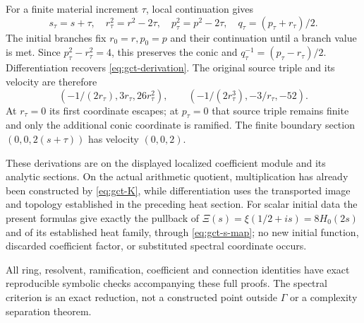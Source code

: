 For a finite material increment $\tau$, local continuation gives
\[
 s_\tau=s+\tau,\quad r_\tau^2=r^2-2\tau,\quad
 p_\tau^2=p^2-2\tau,\quad q_\tau=(p_\tau+r_\tau)/2.
\]
The initial branches fix $r_0=r,p_0=p$ and their continuation until a
branch value is met. Since $p_\tau^2-r_\tau^2=4$, this preserves the
conic and $q_\tau^{-1}=(p_\tau-r_\tau)/2$.
Differentiation recovers \eqref{eq:gct-derivation}. The original source
triple and its velocity are therefore
\[
 (-1/(2r_\tau),3r_\tau,26r_\tau^2),\qquad
 (-1/(2r_\tau^3),-3/r_\tau,-52).
\]
At $r_\tau=0$ its first coordinate escapes; at $p_\tau=0$ that source
triple remains finite and only the additional conic coordinate is
ramified. The finite boundary section $(0,0,2(s+\tau))$ has velocity
$(0,0,2)$.

These derivations are on the displayed localized coefficient module and
its analytic sections. On the actual arithmetic quotient, multiplication
has already been constructed by \eqref{eq:gct-K}, while differentiation
uses the transported image and topology established in the preceding
heat section. For scalar initial data the present formulas give exactly
the pullback of $\Xi(s)=\xi(1/2+is)=8H_0(2s)$ and of its established
heat family, through \eqref{eq:gct-s-map}; no new initial function,
discarded coefficient factor, or substituted spectral coordinate occurs.

All ring, resolvent, ramification, coefficient and connection identities
have exact reproducible symbolic checks accompanying these full proofs.
The spectral criterion is an exact reduction, not a constructed point
outside $\Gamma$ or a complexity separation theorem.

